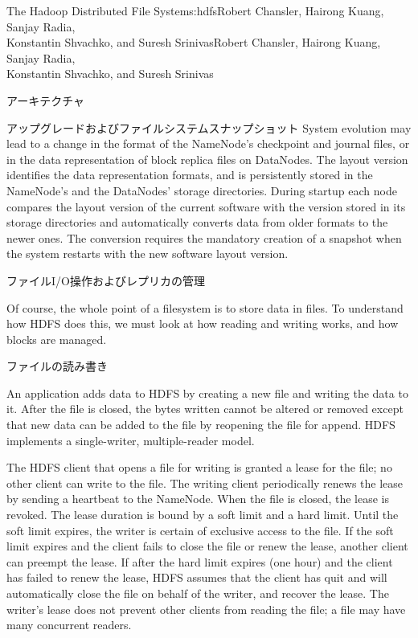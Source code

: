 \begin{aosachaptertoc}{The Hadoop Distributed File System}{s:hdfs}{Robert Chansler, Hairong Kuang, Sanjay Radia, \\ Konstantin Shvachko, and Suresh Srinivas}{Robert Chansler, Hairong Kuang, Sanjay Radia, \\ \hspace*{0.9cm} Konstantin Shvachko, and Suresh Srinivas}
\begin{aosasect1}{アーキテクチャ}
\begin{aosasect2}{アップグレードおよびファイルシステムスナップショット}
System evolution may lead to a change in the format of the NameNode's
checkpoint and journal files, or in the data representation of block
replica files on DataNodes. The layout version identifies the data
representation formats, and is persistently stored in the NameNode's
and the DataNodes' storage directories. During startup each node
compares the layout version of the current software with the version
stored in its storage directories and automatically converts data from
older formats to the newer ones. The conversion requires the mandatory
creation of a snapshot when the system restarts with the new software
layout version.

\end{aosasect2}

\end{aosasect1}

\begin{aosasect1}{ファイルI/O操作およびレプリカの管理}

Of course, the whole point of a filesystem is to store data in
files.  To understand how HDFS does this, we must look at how reading
and writing works, and how blocks are managed.

\begin{aosasect2}{ファイルの読み書き}

An application adds data to HDFS by creating a new file and writing
the data to it. After the file is closed, the bytes written cannot be
altered or removed except that new data can be added to the file by
reopening the file for append. HDFS implements a single-writer,
multiple-reader model.

The HDFS client that opens a file for writing is granted a lease for
the file; no other client can write to the file.  The writing client
periodically renews the lease by sending a heartbeat to the
NameNode. When the file is closed, the lease is revoked. The lease
duration is bound by a soft limit and a hard limit. Until the soft
limit expires, the writer is certain of exclusive access to the
file. If the soft limit expires and the client fails to close the file
or renew the lease, another client can preempt the lease. If after the
hard limit expires (one hour) and the client has failed to renew the
lease, HDFS assumes that the client has quit and will automatically
close the file on behalf of the writer, and recover the lease. The
writer's lease does not prevent other clients from reading the file; a
file may have many concurrent readers.


\end{aosasect2}
\end{aosasect1}
\end{aosachaptertoc}
